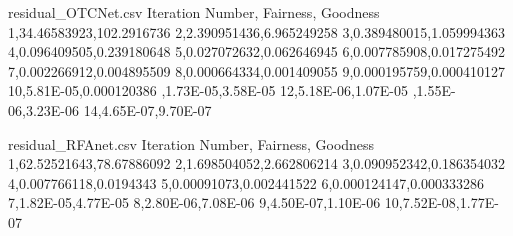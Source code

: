   \begin{filecontents*}{residual_OTCNet.csv}
  Iteration Number, Fairness, Goodness
  1,34.46583923,102.2916736
  2,2.390951436,6.965249258
  3,0.389480015,1.059994363
  4,0.096409505,0.239180648
  5,0.027072632,0.062646945
  6,0.007785908,0.017275492
  7,0.002266912,0.004895509
  8,0.000664334,0.001409055
  9,0.000195759,0.000410127
  10,5.81E-05,0.000120386
,1.73E-05,3.58E-05
  12,5.18E-06,1.07E-05
,1.55E-06,3.23E-06
  14,4.65E-07,9.70E-07
  \end{filecontents*}
  
  \begin{filecontents*}{residual_RFAnet.csv}
  Iteration Number, Fairness, Goodness
  1,62.52521643,78.67886092
  2,1.698504052,2.662806214
  3,0.090952342,0.186354032
  4,0.007766118,0.0194343
  5,0.00091073,0.002441522
  6,0.000124147,0.000333286
  7,1.82E-05,4.77E-05
  8,2.80E-06,7.08E-06
  9,4.50E-07,1.10E-06
  10,7.52E-08,1.77E-07
  \end{filecontents*}
  
